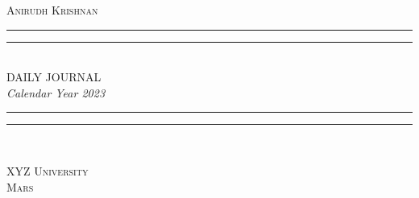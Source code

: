 \begin{titlepage}
    \centering
    \settowidth{\unitlength}{\LARGE THE BOOK OF CONUNDRUMS}
    \vspace*{\baselineskip}
    {\large\scshape Anirudh Krishnan}\\[\baselineskip]
    \rule{\unitlength}{1.6pt}\vspace*{-\baselineskip}\vspace*{2pt}
    \rule{\unitlength}{0.4pt}\\[\baselineskip]
    {\LARGE DAILY JOURNAL}\\[\baselineskip]
    {\itshape Calendar Year 2023}\\[0.2\baselineskip]
    \rule{\unitlength}{0.4pt}\vspace*{-\baselineskip}\vspace{3.2pt}
    \rule{\unitlength}{1.6pt}\\[\baselineskip]
    \par
    \vfill
    {\large\scshape XYZ University}\\[\baselineskip]
    {\small\scshape Mars}\par
    \vspace*{0.1\textheight}
\end{titlepage}